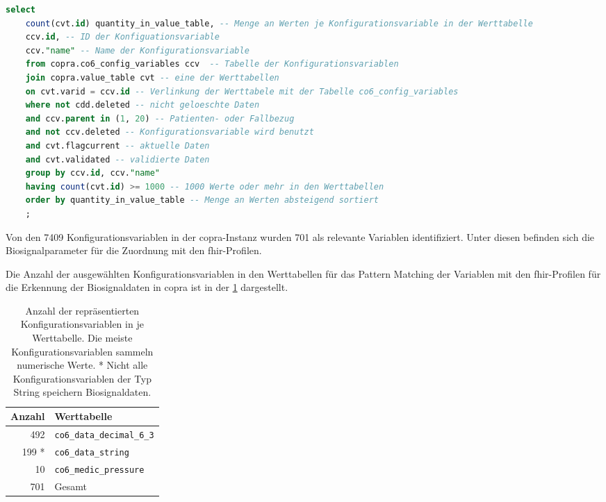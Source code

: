 \begin{lstlisting}[language=SQL, caption={[SQL-Abfrage zur Auswahl der Konfigurationsvariablen] SQL-Abfrage zur Auswahl der Konfigurationsvariablen im COPRA-System. \glqq copra.value\_table cvt\grqq{} stellt die verschiedenen Werttabellen im System dar, also co6\_data\_decimal\_6\_3, co6\_data\_string und co6\_medic\_pressure. \glqq quantity\_in\_value\_table\grqq{} ist ein Alias für die Spalte der Menge an Werten in den Werttabellen.}, captionpos=b, label=list:selectconfigvar]
	select 
	count(cvt.id) quantity_in_value_table, -- Menge an Werten je Konfigurationsvariable in der Werttabelle
	ccv.id, -- ID der Konfiguationsvariable
	ccv."name" -- Name der Konfigurationsvariable
	from copra.co6_config_variables ccv  -- Tabelle der Konfigurationsvariablen 
	join copra.value_table cvt -- eine der Werttabellen
	on cvt.varid = ccv.id -- Verlinkung der Werttabele mit der Tabelle co6_config_variables
	where not cdd.deleted -- nicht geloeschte Daten
	and ccv.parent in (1, 20) -- Patienten- oder Fallbezug
	and not ccv.deleted -- Konfigurationsvariable wird benutzt
	and cvt.flagcurrent -- aktuelle Daten
	and cvt.validated -- validierte Daten
	group by ccv.id, ccv."name" 
	having count(cvt.id) >= 1000 -- 1000 Werte oder mehr in den Werttabellen
	order by quantity_in_value_table -- Menge an Werten absteigend sortiert
	;
\end{lstlisting}

Von den 7409 Konfigurationsvariablen in der \ac{copra}-Instanz wurden 701 als relevante Variablen identifiziert. Unter diesen befinden sich die Biosignalparameter für die Zuordnung mit den \ac{fhir}-Profilen.

Die Anzahl der ausgewählten Konfigurationsvariablen in den Werttabellen für das Pattern Matching der Variablen mit den \ac{fhir}-Profilen für die Erkennung der Biosignaldaten in \ac{copra} ist in der \ref{tab:configvarvaluetables} dargestellt.

\begin{table}[ht]
	\centering  
	\caption[Anzahl der repräsentierten Konfigurationsvariablen in je Werttabelle]{Anzahl der repräsentierten Konfigurationsvariablen in je Werttabelle. Die meiste Konfigurationsvariablen sammeln numerische Werte. * Nicht alle Konfigurationsvariablen der Typ String speichern Biosignaldaten.}
	
	\label{tab:configvarvaluetables}
	\begin{tabular}{|r|l|}
		\hline
		\bfseries Anzahl & \bfseries Werttabelle \\ \hline
		492 & \texttt{co6\_data\_decimal\_6\_3} \\ \hline %
		199 * & \texttt{co6\_data\_string} \\ \hline %
		10 & \texttt{co6\_medic\_pressure} \\ \hline %
		701 & Gesamt \\ \hline %
	\end{tabular}
\end{table}